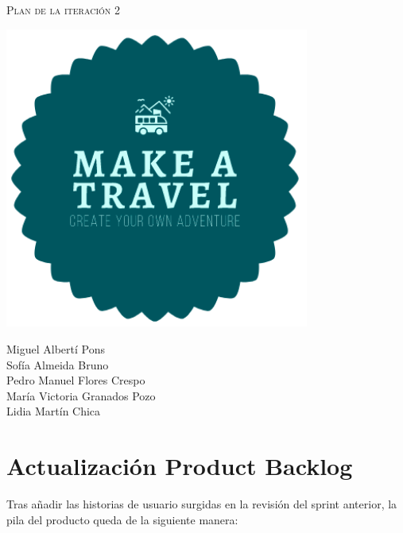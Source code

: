 \documentclass[11pt]{article}
\begin{document}
\begin{titlepage}
\centering
\vspace{4.5cm}
{\scshape\LARGE Plan de la iteración 2\par}
\vspace{1.5cm}

\includegraphics[width=10cm] {Logo}

\vspace{3cm}
{\scshape\large \par}
\vspace{1cm}

{Miguel Albertí Pons\\
Sofía Almeida Bruno\\
Pedro Manuel Flores Crespo\\
María Victoria Granados Pozo\\
Lidia Martín Chica
\par}

\end{titlepage}

\newpage

\section{Actualización Product Backlog}
Tras añadir las historias de usuario surgidas en la revisión del sprint anterior, la pila del producto queda de la siguiente manera:
\end{document}
